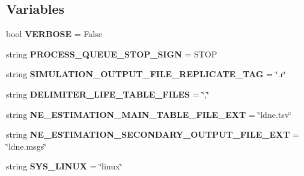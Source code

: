 \subsection*{Variables}
\begin{DoxyCompactItemize}
\item 
bool {\bfseries V\+E\+R\+B\+O\+SE} = False\hypertarget{namespacenegui_1_1pgutilities_a274572b1b2788c24df3e269bc2a3f1f7}{}\label{namespacenegui_1_1pgutilities_a274572b1b2788c24df3e269bc2a3f1f7}

\item 
string {\bfseries P\+R\+O\+C\+E\+S\+S\+\_\+\+Q\+U\+E\+U\+E\+\_\+\+S\+T\+O\+P\+\_\+\+S\+I\+GN} = \textquotesingle{}S\+T\+OP\textquotesingle{}\hypertarget{namespacenegui_1_1pgutilities_aed436e1fc2eb29963ea30b17e614fd04}{}\label{namespacenegui_1_1pgutilities_aed436e1fc2eb29963ea30b17e614fd04}

\item 
string {\bfseries S\+I\+M\+U\+L\+A\+T\+I\+O\+N\+\_\+\+O\+U\+T\+P\+U\+T\+\_\+\+F\+I\+L\+E\+\_\+\+R\+E\+P\+L\+I\+C\+A\+T\+E\+\_\+\+T\+AG} = \char`\"{}.r\char`\"{}\hypertarget{namespacenegui_1_1pgutilities_aeca2401751f6dc9cd4acbe9765271e20}{}\label{namespacenegui_1_1pgutilities_aeca2401751f6dc9cd4acbe9765271e20}

\item 
string {\bfseries D\+E\+L\+I\+M\+I\+T\+E\+R\+\_\+\+L\+I\+F\+E\+\_\+\+T\+A\+B\+L\+E\+\_\+\+F\+I\+L\+ES} = \char`\"{},\char`\"{}\hypertarget{namespacenegui_1_1pgutilities_ad2dc8f53cd27db093fc7f1227367d833}{}\label{namespacenegui_1_1pgutilities_ad2dc8f53cd27db093fc7f1227367d833}

\item 
string {\bfseries N\+E\+\_\+\+E\+S\+T\+I\+M\+A\+T\+I\+O\+N\+\_\+\+M\+A\+I\+N\+\_\+\+T\+A\+B\+L\+E\+\_\+\+F\+I\+L\+E\+\_\+\+E\+XT} = \char`\"{}ldne.\+tsv\char`\"{}\hypertarget{namespacenegui_1_1pgutilities_aa78d8e8004985b127644b8c985a2b551}{}\label{namespacenegui_1_1pgutilities_aa78d8e8004985b127644b8c985a2b551}

\item 
string {\bfseries N\+E\+\_\+\+E\+S\+T\+I\+M\+A\+T\+I\+O\+N\+\_\+\+S\+E\+C\+O\+N\+D\+A\+R\+Y\+\_\+\+O\+U\+T\+P\+U\+T\+\_\+\+F\+I\+L\+E\+\_\+\+E\+XT} = \char`\"{}ldne.\+msgs\char`\"{}\hypertarget{namespacenegui_1_1pgutilities_adfda5d480a10cf273a287871a5aba972}{}\label{namespacenegui_1_1pgutilities_adfda5d480a10cf273a287871a5aba972}

\item 
string {\bfseries S\+Y\+S\+\_\+\+L\+I\+N\+UX} = \char`\"{}linux\char`\"{}\hypertarget{namespacenegui_1_1pgutilities_aeccb8b0b17c7d891838cba42245af21f}{}\label{namespacenegui_1_1pgutilities_aeccb8b0b17c7d891838cba42245af21f}


\end{DoxyCompactItemize}
